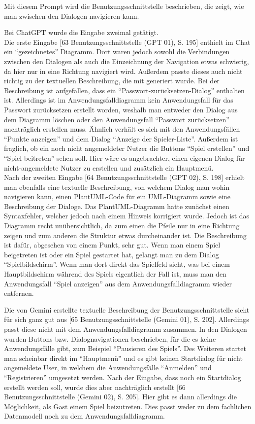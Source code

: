 Mit diesem Prompt wird die Benutzungsschnittstelle beschrieben, die zeigt, wie man zwischen den Dialogen navigieren kann.

Bei ChatGPT wurde die Eingabe zweimal getätigt.\\
Die erste Eingabe [63 Benutzungsschnittstelle (GPT 01), S. 195] enthielt im Chat ein ``gezeichnetes'' Diagramm. Dort waren jedoch sowohl die Verbindungen zwischen den 
Dialogen als auch die Einzeichnung der Navigation etwas schwierig, da hier nur in eine Richtung navigiert wird. Außerdem 
passte dieses auch nicht richtig zu der textuellen Beschreibung, die mit generiert wurde. Bei der Beschreibung ist aufgefallen, 
dass ein ``Passwort-zurücksetzen-Dialog'' enthalten ist. Allerdings ist im Anwendungsfalldiagramm kein Anwendungsfall für das 
Passwort zurücksetzen erstellt worden, weshalb man entweder den Dialog aus dem Diagramm löschen oder den Anwendungsfall 
``Passwort zurücksetzen'' nachträglich erstellen muss. Ähnlich verhält es sich mit den Anwendungsfällen ``Punkte anzeigen'' und dem 
Dialog ``Anzeige der Spieler-Liste''. Außerdem ist fraglich, ob ein noch nicht angemeldeter Nutzer die Buttons ``Spiel erstellen'' 
und ``Spiel beitreten'' sehen soll. Hier wäre es angebrachter, einen eigenen Dialog für nicht-angemeldete Nutzer zu erstellen und 
zusätzlich ein Hauptmenü.\\
Nach der zweiten Eingabe [64 Benutzungsschnittstelle (GPT 02), S. 198] erhielt man ebenfalls eine textuelle Beschreibung, von welchem Dialog man wohin navigieren kann, einen 
PlantUML-Code für ein UML-Diagramm sowie eine Beschreibung der Dialoge. Das PlantUML-Diagramm hatte zunächst einen Syntaxfehler, 
welcher jedoch nach einem Hinweis korrigiert wurde. Jedoch ist das Diagramm recht unübersichtlich, da zum einen die Pfeile nur in 
eine Richtung zeigen und zum anderen die Struktur etwas durcheinander ist. Die Beschreibung ist dafür, abgesehen von einem Punkt, 
sehr gut. Wenn man einem Spiel beigetreten ist oder ein Spiel gestartet hat, gelangt man zu dem Dialog ``Spielbildschirm''. Wenn man 
dort direkt das Spielfeld sieht, was bei einem Hauptbildschirm während des Spiels eigentlich der Fall ist, muss man den Anwendungsfall 
``Spiel anzeigen'' aus dem Anwendungsfalldiagramm wieder entfernen.

Die von Gemini erstellte textuelle Beschreibung der Benutzungsschnittstelle sieht für sich ganz gut aus [65 Benutzungsschnittstelle (Gemini 01), S. 202]. Allerdings passt diese nicht 
mit dem Anwendungsfalldiagramm zusammen. In den Dialogen wurden Buttons bzw. Dialognavigationen beschrieben, für die es keine 
Anwendungsfälle gibt, zum Beispiel ``Pausieren des Spiels''. Des Weiteren startet man scheinbar direkt im ``Hauptmenü'' und es gibt keinen 
Startdialog für nicht angemeldete User, in welchem die Anwendungsfälle ``Anmelden'' und ``Registrieren'' umgesetzt werden. Nach der Eingabe, 
dass noch ein Startdialog erstellt werden soll, wurde dies aber nachträglich erstellt [66 Benutzungsschnittstelle (Gemini 02), S. 205]. Hier gibt es dann allerdings die Möglichkeit, 
als Gast einem Spiel beizutreten. Dies passt weder zu dem fachlichen Datenmodell noch zu dem Anwendungsfalldiagramm.

